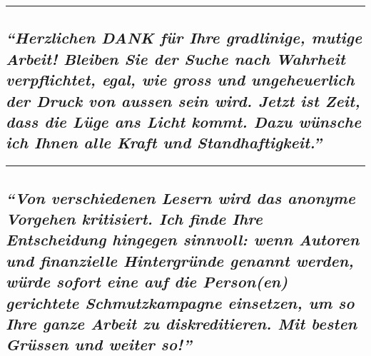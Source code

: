 \begin{center}\rule{0.5\linewidth}{\linethickness}\end{center}

\hypertarget{herzlichen-dank-fuxfcr-ihre-gradlinige-mutige-arbeit-bleiben-sie-der-suche-nach-wahrheit-verpflichtet-egal-wie-gross-und-ungeheuerlich-der-druck-von-aussen-sein-wird-jetzt-ist-zeit-dass-die-luxfcge-ans-licht-kommt-dazu-wuxfcnsche-ich-ihnen-alle-kraft-und-standhaftigkeit}{%
\subsection{\texorpdfstring{\emph{``Herzlichen DANK für Ihre gradlinige,
mutige Arbeit! Bleiben Sie der Suche nach Wahrheit verpflichtet, egal,
wie gross und ungeheuerlich der Druck von aussen sein wird. Jetzt ist
Zeit, dass die Lüge ans Licht kommt. Dazu wünsche ich Ihnen alle Kraft
und
Standhaftigkeit.''}}{``Herzlichen DANK für Ihre gradlinige, mutige Arbeit! Bleiben Sie der Suche nach Wahrheit verpflichtet, egal, wie gross und ungeheuerlich der Druck von aussen sein wird. Jetzt ist Zeit, dass die Lüge ans Licht kommt. Dazu wünsche ich Ihnen alle Kraft und Standhaftigkeit.''}}\label{herzlichen-dank-fuxfcr-ihre-gradlinige-mutige-arbeit-bleiben-sie-der-suche-nach-wahrheit-verpflichtet-egal-wie-gross-und-ungeheuerlich-der-druck-von-aussen-sein-wird-jetzt-ist-zeit-dass-die-luxfcge-ans-licht-kommt-dazu-wuxfcnsche-ich-ihnen-alle-kraft-und-standhaftigkeit}}

\begin{center}\rule{0.5\linewidth}{\linethickness}\end{center}

\hypertarget{von-verschiedenen-lesern-wird-das-anonyme-vorgehen-kritisiert-ich-finde-ihre-entscheidung-hingegen-sinnvoll-wenn-autoren-und-finanzielle-hintergruxfcnde-genannt-werden-wuxfcrde-sofort-eine-auf-die-personen-gerichtete-schmutzkampagne-einsetzen-um-so-ihre-ganze-arbeit-zu-diskreditieren-mit-besten-gruxfcssen-und-weiter-so}{%
\subsection{\texorpdfstring{\emph{``Von verschiedenen Lesern wird das
anonyme Vorgehen kritisiert. Ich finde Ihre Entscheidung hingegen
sinnvoll: wenn Autoren und finanzielle Hintergründe genannt werden,
würde sofort eine auf die Person(en) gerichtete Schmutzkampagne
einsetzen, um so Ihre ganze Arbeit zu diskreditieren. Mit besten Grüssen
und weiter
so!''}}{``Von verschiedenen Lesern wird das anonyme Vorgehen kritisiert. Ich finde Ihre Entscheidung hingegen sinnvoll: wenn Autoren und finanzielle Hintergründe genannt werden, würde sofort eine auf die Person(en) gerichtete Schmutzkampagne einsetzen, um so Ihre ganze Arbeit zu diskreditieren. Mit besten Grüssen und weiter so!''}}\label{von-verschiedenen-lesern-wird-das-anonyme-vorgehen-kritisiert-ich-finde-ihre-entscheidung-hingegen-sinnvoll-wenn-autoren-und-finanzielle-hintergruxfcnde-genannt-werden-wuxfcrde-sofort-eine-auf-die-personen-gerichtete-schmutzkampagne-einsetzen-um-so-ihre-ganze-arbeit-zu-diskreditieren-mit-besten-gruxfcssen-und-weiter-so}}

